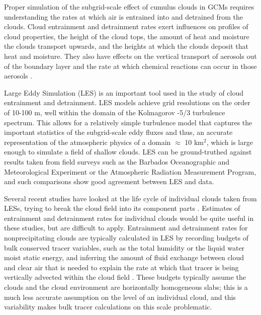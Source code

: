 \documentclass[12pt]{article}
\begin{document}
Proper simulation of the subgrid-scale effect of cumulus clouds in GCMs requires 
understanding the rates at which air is entrained into and detrained from the 
clouds. Cloud entrainment and detrainment rates exert influences on profiles of 
cloud properties, the height of the cloud tops, the amount of heat and moisture 
the clouds transport upwards, and the heights at which the clouds deposit that 
heat and moisture.  They also have effects on the vertical transport of 
aerosols out of the boundary layer and the rate at which chemical reactions can 
occur in those aerosols \citep{Barahona2007,Anldrejczuk2008}.

Large Eddy Simulation (LES) is an important tool used in the study of cloud 
entrainment and detrainment. LES models achieve grid resolutions on the order 
of 10-100 m, well within the domain of the Kolmagorov -5/3 turbulence spectrum. 
This allows for a relatively simple turbulence model that captures the 
important statistics of the subgrid-scale eddy fluxes and thus, an accurate 
representation of the atmospheric physics of a domain $\approx$ 10 km$^{2}$, 
which is large enough to simulate a field of shallow clouds.  LES can be 
ground-truthed against results taken from field surveys such as the Barbados 
Oceanographic and Meteorological Experiment \citep[BOMEX;][]{Holland1973} or 
the Atmospheric Radiation Measurement \citep[ARM;][]{Brown2002} Program, and 
such comparisons show good agreement between LES and data.

Several recent studies have looked at the life cycle of individual clouds taken 
from LESs, trying to break the cloud field into its component parts 
\citep{Zhao2005,Zhao2005a,Heus2009}.  Estimates of entrainment and detrainment 
rates for individual clouds would be quite useful in these studies, but are 
difficult to apply. Entrainment and detrainment rates for nonprecipitating 
clouds are typically calculated in LES by recording budgets of bulk conserved 
tracer variables, such as the total humidity or the liquid water moist static 
energy, and inferring the amount of fluid exchange between cloud and clear air 
that is needed to explain the rate at which that tracer is being vertically 
advected within the cloud field \citep{Siebesma1995}. These budgets typically 
assume the clouds and the cloud environment are horizontally homogeneous slabs; 
this is a much less accurate assumption on the level of an individual cloud, and 
this variability makes bulk tracer calculations on this scale problematic.
\end{document}
